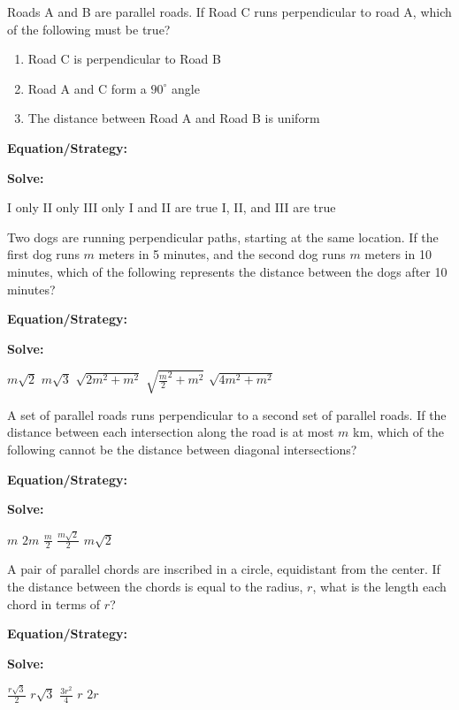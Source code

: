 \vfill
\newpage
\begin{multicols*}{2}
\begin{outline}[enumerate]
\medium

\1 Roads A and B are parallel roads. If Road C runs perpendicular to road A, which of the following must be true?

\begin{enumerate}[label=\Roman*.]
\item Road C is perpendicular to Road B
\item Road A and C form a $90^\circ$ angle
\item The distance between Road A and Road B is uniform
\end{enumerate}

\bigskip
\textbf{Equation/Strategy:} \hrulefill

\bigskip
\textbf{Solve:}

\vfill
\2 I only
\2 II only
\2 III only
\2 I and II are true
\2 I, II, and III are true

\midline

\1 Two dogs are running perpendicular paths, starting at the same location. If the first dog runs $m$ meters in 5 minutes, and the second dog runs $m$ meters in 10 minutes, which of the following represents the distance between the dogs after 10 minutes?

\bigskip
\textbf{Equation/Strategy:} \hrulefill

\bigskip
\textbf{Solve:}

\vfill
\2 $m\sqrt{2}$
\2 $m\sqrt{3}$
\2 $\sqrt{2m^2+m^2}$
\2 $\sqrt{\frac{m}{2}^2+m^2}$
\2 $\sqrt{4m^2+m^2}$

\columnbreak
\advanced

\1 A set of parallel roads runs perpendicular to a second set of parallel roads. If the distance between each intersection along the road is at most $m$ km, which of the following cannot be the distance between diagonal intersections?

\bigskip
\textbf{Equation/Strategy:} \hrulefill

\bigskip
\textbf{Solve:}

\vfill
\2 $m$
\2 $2m$
\2 $\frac{m}{2}$
\2 $\frac{m\sqrt{2}}{2}$
\2 $m\sqrt{2}$

\midline

\1 A pair of parallel chords are inscribed in a circle, equidistant from the center. If the distance between the chords is equal to the radius, $r$, what is the length each chord in terms of $r$?

\bigskip
\textbf{Equation/Strategy:}

\bigskip
\textbf{Solve:}

\vfill
\2 $\frac{r\sqrt{3}}{2}$
\2 $r\sqrt{3}$
\2 $\frac{3r^2}{4}$
\2 $r$
\2 $2r$
\end{outline}
\end{multicols*}